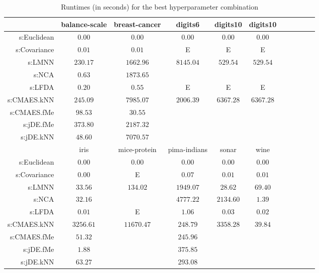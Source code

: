 \begin{table}[ht] \centering
{\small\renewcommand{\arraystretch}{1.0}
\setlength{\tabcolsep}{2pt}
\begin{tabular}{rcccccccccc}
\toprule


& \multicolumn{1}{c}{balance-scale} & \multicolumn{1}{c}{breast-cancer} & \multicolumn{1}{c}{digits6} & \multicolumn{1}{c}{digits10} & \multicolumn{1}{c}{digits10} \\ 
\midrule
s:Euclidean & $\bm{0.00}$ & $\bm{0.00}$ & $\bm{0.00}$ & $\bm{0.00}$ & $\bm{0.00}$ \\
s:Covariance & $0.01$ & $0.01$ & E  & E  & E  \\
s:LMNN & $230.17$ & $1662.96$ & $8145.04$ & $529.54$ & $529.54$ \\
s:NCA & $0.63$ & $1873.65$ &  &  &  \\
s:LFDA & $0.20$ & $0.55$ & E  & E  & E  \\
s:CMAES.kNN & $245.09$ & $7985.07$ & $2006.39$ & $6367.28$ & $6367.28$ \\
s:CMAES.fMe & $98.53$ & $30.55$ &  &  &  \\
s:jDE.fMe & $373.80$ & $2187.32$ &  &  &  \\
s:jDE.kNN & $48.60$ & $7070.57$ &  &  &  \\
\midrule
& \multicolumn{1}{c}{iris} & \multicolumn{1}{c}{mice-protein} & \multicolumn{1}{c}{pima-indians} & \multicolumn{1}{c}{sonar} & \multicolumn{1}{c}{wine} \\ 
\midrule
s:Euclidean & $\bm{0.00}$ & $\bm{0.00}$ & $\bm{0.00}$ & $\bm{0.00}$ & $\bm{0.00}$ \\
s:Covariance & $\bm{0.00}$ & E  & $0.07$ & $0.01$ & $0.01$ \\
s:LMNN & $33.56$ & $134.02$ & $1949.07$ & $28.62$ & $69.40$ \\
s:NCA & $32.16$ &  & $4777.22$ & $2134.60$ & $1.39$ \\
s:LFDA & $0.01$ & E  & $1.06$ & $0.03$ & $0.02$ \\
s:CMAES.kNN & $3256.61$ & $11670.47$ & $248.79$ & $3358.28$ & $39.84$ \\
s:CMAES.fMe & $51.32$ &  & $245.96$ &  &  \\
s:jDE.fMe & $1.88$ &  & $375.85$ &  &  \\
s:jDE.kNN & $63.27$ &  & $293.08$ &  &  \\


\bottomrule
\end{tabular}
}
\caption{Runtimes (in seconds) for the best hyperparameter combination} \label{tab:runtimes}
\end{table}

